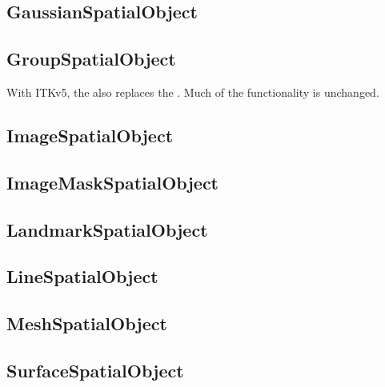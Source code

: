 \subsection{GaussianSpatialObject}%
\label{sec:GaussianSpatialObject}



\subsection{GroupSpatialObject}%
\label{sec:GroupSpatialObject}


With ITKv5, the  also replaces the
 . Much of the functionality is unchanged.



\subsection{ImageSpatialObject}%
\label{sec:ImageSpatialObject}



\subsection{ImageMaskSpatialObject}%
\label{sec:ImageMaskSpatialObject}



\subsection{LandmarkSpatialObject}%
\label{sec:LandmarkSpatialObject}



\subsection{LineSpatialObject}%
\label{sec:LineSpatialObject}



\subsection{MeshSpatialObject}%
\label{sec:MeshSpatialObject}



\subsection{SurfaceSpatialObject}%
\label{sec:SurfaceSpatialObject}



